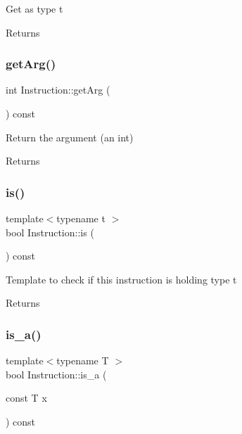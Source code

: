 Get as type t \begin{DoxyReturn}{Returns}

\end{DoxyReturn}
\mbox{\label{class_instruction_a83a2763aa1dab5281b27dd99925f683e}} 
\subsubsection{\texorpdfstring{get\+Arg()}{getArg()}}
{\footnotesize\ttfamily int Instruction\+::get\+Arg (\begin{DoxyParamCaption}{ }\end{DoxyParamCaption}) const\hspace{0.3cm}{\ttfamily [inline]}}

Return the argument (an int) \begin{DoxyReturn}{Returns}

\end{DoxyReturn}
\mbox{\label{class_instruction_ade73e12471250fd191362d462e2f4970}} 
\subsubsection{\texorpdfstring{is()}{is()}}
{\footnotesize\ttfamily template$<$typename t $>$ \\
bool Instruction\+::is (\begin{DoxyParamCaption}{ }\end{DoxyParamCaption}) const\hspace{0.3cm}{\ttfamily [inline]}}

Template to check if this instruction is holding type t \begin{DoxyReturn}{Returns}

\end{DoxyReturn}
\mbox{\label{class_instruction_a924203cd9a0516d64556ecbf6a79df8a}} 
\subsubsection{\texorpdfstring{is\+\_\+a()}{is\_a()}\hspace{0.1cm}{\footnotesize\ttfamily [1/2]}}
{\footnotesize\ttfamily template$<$typename T $>$ \\
bool Instruction\+::is\+\_\+a (\begin{DoxyParamCaption}\item[{const T}]{x }\end{DoxyParamCaption}) const\hspace{0.3cm}{\ttfamily [inline]}}



